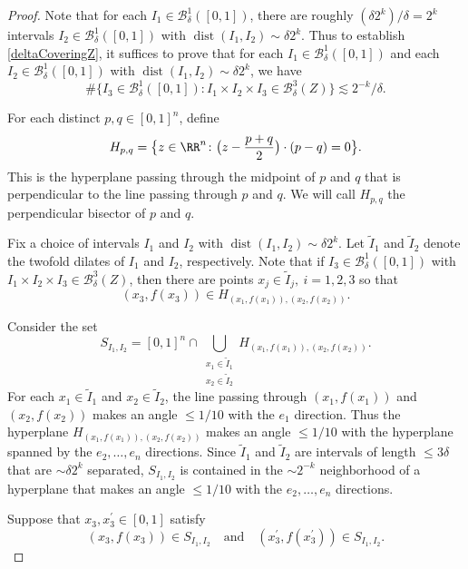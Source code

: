\begin{proof}
Note that for each $I_1 \in \mathcal{B}_{\delta}^1([0,1])$, there are roughly $(\delta 2^k)/\delta=2^k$ intervals $I_2\in  \mathcal{B}_{\delta}^1([0,1])$ with $\operatorname{dist}(I_1,I_2)\sim \delta 2^k$. Thus to establish \eqref{deltaCoveringZ}, it suffices to prove that for each $I_1 \in \mathcal{B}_{\delta}^1([0,1])$ and each $I_2\in  \mathcal{B}_{\delta}^1([0,1])$ with $\operatorname{dist}(I_1,I_2)\sim \delta 2^k$, we have
\begin{equation}\label{numberOfI3}
\#\{ I_3\in \mathcal{B}_{\delta}^1([0,1])\colon  I_1\times I_2\times I_3\in \mathcal{B}_{\delta}^{3}(Z) \}\lesssim 2^{-k}/\delta.
\end{equation}

For each distinct $p,q\in [0,1]^n$, define 
$$
H_{p,q}=\big\{z\in \RR^n\colon \big(z-\frac{p+q}{2}\big)\cdot (p-q)=0  \big\}.
$$
This is the hyperplane passing through the midpoint of $p$ and $q$ that is perpendicular to the line passing through $p$ and $q$. We will call $H_{p,q}$ the perpendicular bisector of $p$ and $q$.

Fix a choice of intervals $I_1$ and $I_2$ with $\operatorname{dist}(I_1,I_2)\sim \delta 2^k$. Let $\tilde I_1$ and $\tilde I_2$ denote the twofold dilates of $I_1$ and $I_2$, respectively. Note that if $I_3\in\mathcal{B}_\delta^1([0,1])$ with $I_1\times I_2\times I_3\in \mathcal{B}_{\delta}^{3}(Z)$, then there are points $x_j\in \tilde I_j,\ i=1,2,3$ so that 
$$
(x_3,f(x_3))\in H_{(x_1,f(x_1)), (x_2,f(x_2))}.
$$

Consider the set
$$
S_{I_1,I_2}=[0,1]^n \cap \bigcup_{\substack{x_1\in \tilde I_1\\ x_2\in \tilde I_2}}H_{(x_1,f(x_1)), (x_2,f(x_2))}.
$$
For each $x_1\in \tilde I_1$ and $x_2\in \tilde I_2$, the line passing through $(x_1,f(x_1))$ and $(x_2,f(x_2))$ makes an angle $\leq 1/10$ with the $e_1$ direction. Thus the hyperplane $H_{(x_1,f(x_1)), (x_2,f(x_2))}$ makes an angle $\leq 1/10$ with the hyperplane spanned by the $e_2,\ldots,e_n$ directions. Since $\tilde I_1$ and $\tilde I_2$ are intervals of length $\leq 3\delta$ that are $\sim \delta 2^k$ separated, $S_{I_1,I_2}$ is contained in the $\sim 2^{-k}$ neighborhood of a hyperplane that makes an angle $\leq 1/10$ with the $e_2,\ldots,e_n$ directions.  

Suppose that $x_3,x_3^\prime\in [0,1]$ satisfy
\begin{equation}\label{x3x3pContainedR}
(x_3,f(x_3))\in S_{I_1,I_2}\quad\textrm{and}\quad(x_3^\prime,f(x_3^\prime))\in S_{I_1,I_2}.
\end{equation}


\end{proof}
